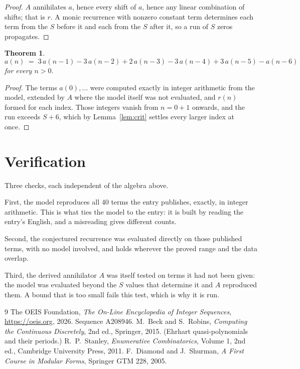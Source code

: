 \documentclass[11pt,a4paper]{article}
\theoremstyle{plain}
\newtheorem{theorem}{Theorem}
\theoremstyle{definition}
\begin{document}
\begin{proof}
$A$ annihilates $a$, hence every shift of $a$, hence any linear combination of shifts; that is
$r$. A monic recurrence with nonzero constant term determines each term from the $S$ before it
and each from the $S$ after it, so a run of $S$ zeros propagates.
\end{proof}

\begin{theorem}
\[
a(n)\;=\;3\,a(n-1) - 3\,a(n-2) + 2\,a(n-3) - 3\,a(n-4) + 3\,a(n-5) - a(n-6)
\]
for every $n>0$.
\end{theorem}

\begin{proof}
The terms $a(0),\dots$ were computed exactly in integer arithmetic from the model, extended by
$A$ where the model itself was not evaluated, and $r(n)$ formed for each index. Those integers
vanish from $n=0+1$ onwards, and the run exceeds $S+6$, which by
Lemma~\ref{lem:crit} settles every larger index at once.
\end{proof}

\section{Verification}

Three checks, each independent of the algebra above.

First, the model reproduces all $40$ terms the entry publishes, exactly, in integer
arithmetic. This is what ties the model to the entry: it is built by reading the entry's
English, and a misreading gives different counts.

Second, the conjectured recurrence was evaluated directly on those published terms, with no
model involved, and holds wherever the proved range and the data overlap.

Third, the derived annihilator $A$ was itself tested on terms it had not been given: the model
was evaluated beyond the $S$ values that determine it and $A$ reproduced them. A bound that is
too small fails this test, which is why it is run.

\begin{thebibliography}{9}
 The OEIS Foundation, \emph{The On-Line Encyclopedia of Integer
Sequences}, \url{https://oeis.org}, 2026. Sequence A208946.
 M.~Beck and S.~Robins, \emph{Computing the Continuous Discretely},
2nd ed., Springer, 2015. (Ehrhart quasi-polynomials and their periods.)
 R.~P.~Stanley, \emph{Enumerative Combinatorics}, Volume 1, 2nd ed.,
Cambridge University Press, 2011.
 F.~Diamond and J.~Shurman, \emph{A First Course in Modular Forms},
Springer GTM 228, 2005.
\end{thebibliography}
\end{document}
